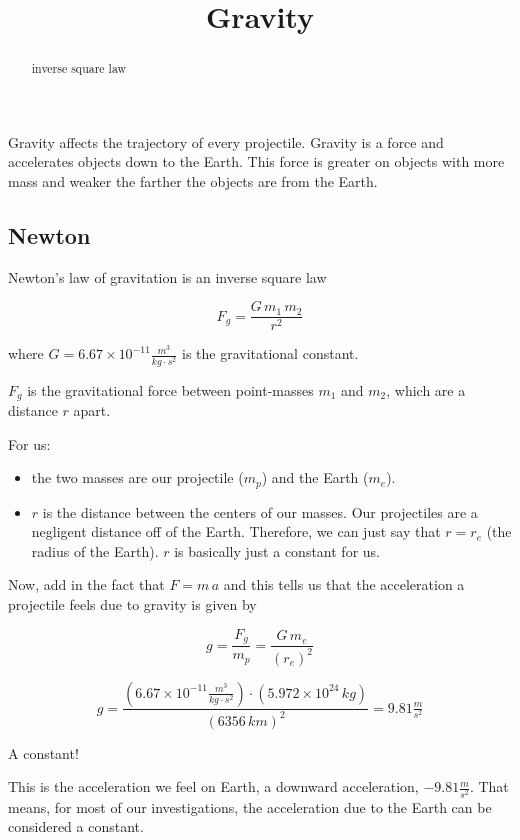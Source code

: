 \documentclass{ximera}
\title{Gravity}
\begin{document}
\begin{abstract}
inverse square law
\end{abstract}
\maketitle




Gravity affects the trajectory of every projectile.  Gravity is a force and accelerates objects down to the Earth. This force is greater on objects with more mass and weaker the farther the objects are from the Earth.




\subsection*{Newton}

Newton's law of gravitation is an inverse square law

\[ F_g = \frac{G \, m_1 \, m_2}{r^2}    \]




where $G = 6.67 \times 10^{-11} \frac{m^3}{kg \cdot s^2}$ is the gravitational constant. 


$F_g$ is the gravitational force between point-masses $m_1$ and $m_2$, which are a distance $r$ apart. 


For us:
\begin{itemize}
\item the two masses are our projectile ($m_p$) and the Earth ($m_e$).
\item $r$ is the distance between the centers of our masses. Our projectiles are a negligent distance off of the Earth.  Therefore, we can just say that $r = r_e$ (the radius of the Earth).  $r$ is basically just a constant for us.
\end{itemize}



Now, add in the fact that $F = m \, a$ and this tells us that the acceleration a projectile feels due to gravity is given by


\[ g = \frac{F_g}{m_p}  = \frac{G \, m_e}{(r_e)^2}    \]


\[ g = \frac{(6.67 \times 10^{-11} \frac{m^3}{kg \cdot s^2}) \cdot (5.972 \times 10^{24} \, kg)}{(6356 \, km)^2} = 9.81 \tfrac{m}{s^2}   \]


A constant! 

This is the acceleration we feel on Earth, a downward acceleration, $-9.81 \frac{m}{s^2}$.   That means, for most of our investigations, the acceleration due to the Earth can be considered a constant.
\end{document}
